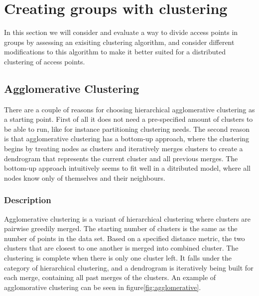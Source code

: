\section{Creating groups with clustering}
In this section we will consider and evaluate a way to divide access points in groups by assessing an exisiting clustering algorithm, and consider different modifications to this algorithm
to make it better suited for a distributed clustering of access points. 

\subsection {Agglomerative Clustering}
There are a couple of reasons for choosing hierarchical agglomerative clustering as a starting point. First of all it does not need a pre-specified amount of clusters to be able to run,
like for instance partitioning clustering needs. The second reason is that agglomerative clustering has a bottom-up approach, where the clustering begins by treating nodes as clusters and iteratively
merges clusters to create a dendrogram that represents the current cluster and all previous merges. The bottom-up approach intuitively seems to fit well in a ditributed model, where all nodes
know only of themselves and their neighbours. 
\subsubsection{Description}
Agglomerative clustering  \cite{agglomerative} is a variant of hierarchical clustering where clusters are pairwise greedily merged. The starting number of clusters is the same as the number of
points in the data set. Based on a specified distance metric, the two clusters that are closest to one another is merged into combined cluster. The clustering is complete
when there is only one cluster left. It falls under the category of hierarchical clustering, and a dendrogram is iteratively being built for each merge,
containing all past merges of the clusters. An example of agglomorative clustering can be seen in {{figure}}\ref{fig:agglomerative}.

